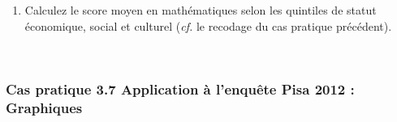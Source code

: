 \documentclass[12pt,twosided, notitlepage]{book}
\newenvironment{Shaded}{}{}
\newcommand{\KeywordTok}[1]{\textcolor[rgb]{0.00,0.00,1.00}{#1}}
\newcommand{\OperatorTok}[1]{#1}
\newcommand{\NormalTok}[1]{#1}
\newif \ifsol
\renewenvironment{Shaded}{\begin{snugshade}}{\end{snugshade}}
\begin{document}
\begin{enumerate}
  \bigskip  \fi 
\item
  Calculez le score moyen en mathématiques selon les quintiles de statut
  économique, social et culturel (\emph{cf.} le recodage du cas pratique
  précédent).

  \ifsol 

  \begin{center} \rule{0.5\linewidth}{\linethickness}\end{center}

\begin{Shaded}
\begin{Highlighting}[]
\KeywordTok{tapply}\NormalTok{(stu2}\OperatorTok{$}\NormalTok{pv1math, stu2}\OperatorTok{$}\NormalTok{escsq, mean)}
\NormalTok{  ## (-3.46,-0.74] (-0.74,-0.21]  (-0.21,0.25]   (0.25,0.72] }
\NormalTok{  ##      441.6501      468.6728      499.9407      532.5550 }
\NormalTok{  ##    (0.72,2.2] }
\NormalTok{  ##      567.2039}
\end{Highlighting}
\end{Shaded}

  La moyenne du score en mathématiques est d'autant plus élevée que le
  statut économique, social et culturel est favorisé.

  \begin{center} \rule{0.5\linewidth}{\linethickness}\end{center}

  \bigskip  \fi 
\end{enumerate}

~

\subsubsection{\texorpdfstring{\textbf{Cas pratique 3.7} Application à
l'enquête Pisa 2012 :
Graphiques}{Cas pratique 3.7 Application à l'enquête Pisa 2012 : Graphiques}}\label{cas-pratique-3.7-application-a-lenquete-pisa-2012-graphiques}

\end{document}
